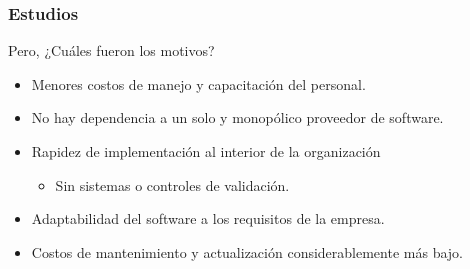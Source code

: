 \frame
{
\frametitle{Estudios}
\Large{Pero, ¿Cuáles fueron los motivos?}
\normalsize
\begin{itemize}
	\item Menores costos de manejo y capacitación del personal.
	\item No hay dependencia a un solo y monopólico proveedor de software.
	\item Rapidez de implementación al interior de la organización
	\begin{itemize}
		\item Sin sistemas o controles de validación.
	\end{itemize}
	\item Adaptabilidad del software a los requisitos de la empresa.
	\item Costos de mantenimiento y actualización considerablemente más bajo.
\end{itemize}
}
